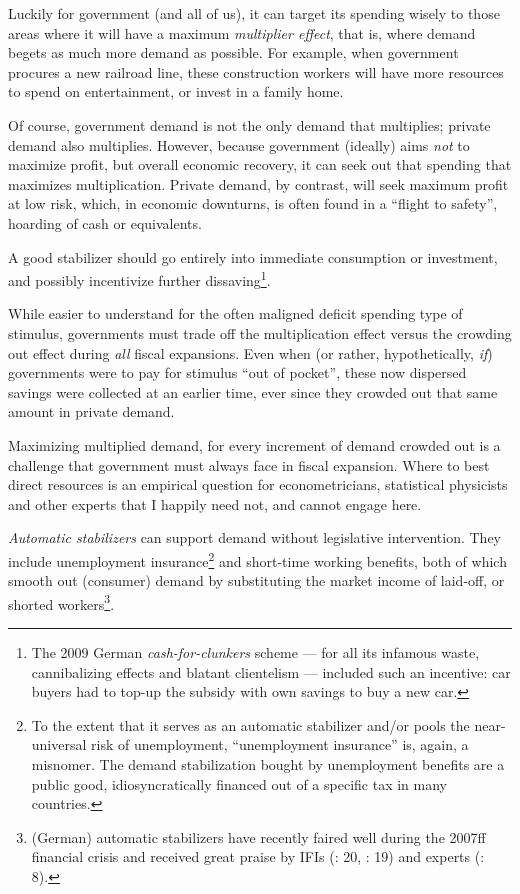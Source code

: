 Luckily for government (and all of us), it can target its spending wisely to those areas where it will have a maximum \emph{multiplier effect}, that is, where demand begets as much more demand as possible. For example, when government procures a new railroad line, these construction workers will have more resources to spend on entertainment, or invest in a family home. 

Of course, government demand is not the only demand that multiplies; private demand also multiplies. However, because government (ideally) aims \emph{not} to maximize profit, but overall economic recovery, it can seek out that spending that maximizes multiplication. Private demand, by contrast, will seek maximum profit at low risk, which, in economic downturns, is often found in a ``flight to safety'', hoarding of cash or equivalents.

A good stabilizer should go entirely into immediate consumption or investment, and possibly incentivize further dissaving\footnote{
	The 2009 German \emph{cash-for-clunkers} scheme --- for all its infamous waste, cannibalizing effects and blatant clientelism --- included such an incentive: car buyers had to top-up the subsidy with own savings to buy a new car.}.

While easier to understand for the often maligned deficit spending type of stimulus, governments must trade off the multiplication effect versus the crowding out effect during \emph{all} fiscal expansions. Even when (or rather, hypothetically, \emph{if}) governments were to pay for stimulus ``out of pocket'', these now dispersed savings were collected at an earlier time, ever since they crowded out that same amount in private demand.

Maximizing multiplied demand, for every increment of demand crowded out is a challenge that government must always face in fiscal expansion. Where to best direct resources is an empirical question for econometricians, statistical physicists and other experts that I happily need not, and cannot engage here. 

	
\emph{Automatic stabilizers} can support demand without legislative intervention. They include unemployment insurance\footnote{
	To the extent that it serves as an automatic stabilizer and/or pools the near-universal risk of unemployment, ``unemployment insurance'' is, again, a misnomer. The demand stabilization bought by unemployment benefits are a public good, idiosyncratically financed out of a specific tax in many countries.} %
and short-time working benefits, both of which smooth out (consumer) demand by substituting the market income of laid-off, or shorted workers\footnote{
	(German) automatic stabilizers have recently faired well during the 2007ff financial crisis and received great praise by \glspl{IFI} (\citealt{IMF-2008-ab}: 20, \citealt{WorldBank2008}: 19) and experts (\citealt{BofingerFranz-2007-aa}: 8).}. 

